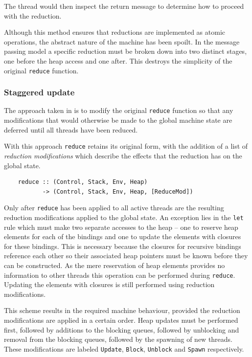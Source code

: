 \documentclass{llncs}
\begin{document}
\noindent
The thread would then inspect the return message to determine how to proceed with the reduction. 

\medskip
\noindent
Although this method ensures that reductions are implemented as atomic operations, the abstract nature of the machine has been spoilt. In the message passing model a specific reduction must be broken down into two distinct stages, one before the heap access and one after. This destroys the simplicity of the original \texttt{reduce} function.

\subsubsection{Staggered update}
The approach taken in \ample is to modify the original \texttt{reduce} function so that any modifications that would otherwise be made to the global machine state are deferred until all threads have been reduced. 

With this approach \texttt{reduce} retains its original form, with the addition of a list of \emph{reduction modifications} which describe the effects that the reduction has on the global state. 

\begin{verbatim}
    reduce :: (Control, Stack, Env, Heap) 
           -> (Control, Stack, Env, Heap, [ReduceMod])
\end{verbatim}

\noindent
Only after \texttt{reduce} has been applied to all active threads are the resulting reduction modifications applied to the global state. An exception lies in the \texttt{let} rule which must make two separate accesses to the heap -- one to reserve heap elements for each of the bindings and one to update the elements with closures for these bindings. This is necessary because the closures for recursive bindings reference each other so their associated heap pointers must be known before they can be constructed. As the mere reservation of heap elements provides no information to other threads this operation can be performed during \texttt{reduce}. Updating the elements with closures is still performed using reduction modifications.

This scheme results in the required machine behaviour, provided the reduction modifications are applied in a certain order. Heap updates must be performed first, followed by additions to the blocking queues, followed by unblocking and removal from the blocking queues, followed by the spawning of new threads. These modifications are labeled \texttt{Update}, \texttt{Block}, \texttt{Unblock} and \texttt{Spawn} respectively.
\end{document}
